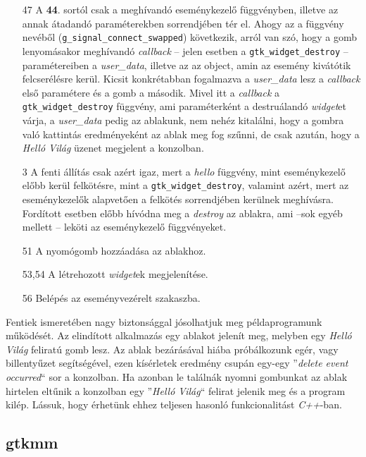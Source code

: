 \begin{enumerate}
 \item[47] A \textbf{44}. sortól csak a meghívandó eseménykezelő függvényben, illetve az annak átadandó paraméterekben sorrendjében tér el. Ahogy az a függvény nevéből (\texttt{g\_signal\_connect\_swapped}) következik, arról van szó, hogy a gomb lenyomásakor meghívandó \textit{callback} -- jelen esetben a \texttt{gtk\_widget\_destroy} -- paramétereiben a \textit{user\_data}, illetve az az object, amin az esemény kivátótik felcserélésre kerül. Kicsit konkrétabban fogalmazva a \textit{user\_data} lesz a \textit{callback} első paramétere és a gomb a második. Mivel itt a \textit{callback} a \texttt{gtk\_widget\_destroy} függvény, ami paraméterként a destruálandó \textit{widget}et várja, a \textit{user\_data} pedig az ablakunk, nem nehéz kitalálni, hogy a gombra való kattintás eredményeként az ablak meg fog szűnni, de csak azután, hogy a \textit{Helló Világ} üzenet megjelent a konzolban.

 \item[3] A fenti állítás csak azért igaz, mert a \textit{hello} függvény, mint eseménykezelő előbb kerül felkötésre, mint a \texttt{gtk\_widget\_destroy}, valamint azért, mert az eseménykezelők alapvetően a felkötés sorrendjében kerülnek meghívásra. Fordított esetben előbb hívódna meg a \textit{destroy} az ablakra, ami --sok egyéb mellett -- leköti az eseménykezelő függvényeket.

 \item[51] A nyomógomb hozzáadása az ablakhoz.

 \item[53,54] A létrehozott \textit{widget}ek megjelenítése.

 \item[56] Belépés az eseményvezérelt szakaszba.

\end{enumerate}

Fentiek ismeretében nagy biztonsággal jósolhatjuk meg példaprogramunk működését. Az elindított alkalmazás egy ablakot jelenít meg, melyben egy \textit{Helló Világ} feliratú gomb lesz. Az ablak bezárásával hiába próbálkozunk egér, vagy billentyűzet segítségével, ezen kísérletek eredmény csupán egy-egy ''\textit{delete event occurred}`` sor a konzolban. Ha azonban le találnák nyomni gombunkat az ablak hirtelen eltűnik a konzolban egy ''\textit{Helló Világ}`` felirat jelenik meg és a program kilép. Lássuk, hogy érhetünk ehhez teljesen hasonló funkcionalitást \textit{C++}-ban.

\subsection{gtkmm}

